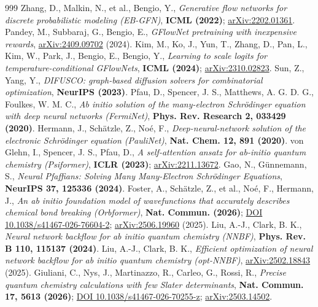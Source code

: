 \documentclass[onecolumn,a4paper]{quantumarticle}
\begin{document}
\begin{thebibliography}{999}
 Zhang, D., Malkin, N., et al., Bengio, Y., \emph{Generative flow networks for discrete probabilistic modeling (EB-GFN)}, \textbf{ICML (2022)}; \href{https://arxiv.org/abs/2202.01361}{arXiv:2202.01361}.
 Pandey, M., Subbaraj, G., Bengio, E., \emph{GFlowNet pretraining with inexpensive rewards}, \href{https://arxiv.org/abs/2409.09702}{arXiv:2409.09702} (2024).
 Kim, M., Ko, J., Yun, T., Zhang, D., Pan, L., Kim, W., Park, J., Bengio, E., Bengio, Y., \emph{Learning to scale logits for temperature-conditional GFlowNets}, \textbf{ICML (2024)}; \href{https://arxiv.org/abs/2310.02823}{arXiv:2310.02823}.
 Sun, Z., Yang, Y., \emph{DIFUSCO: graph-based diffusion solvers for combinatorial optimization}, \textbf{NeurIPS (2023)}.
 Pfau, D., Spencer, J. S., Matthews, A. G. D. G., Foulkes, W. M. C., \emph{Ab initio solution of the many-electron Schrödinger equation with deep neural networks (FermiNet)}, \textbf{Phys. Rev. Research 2, 033429 (2020)}.
 Hermann, J., Schätzle, Z., Noé, F., \emph{Deep-neural-network solution of the electronic Schrödinger equation (PauliNet)}, \textbf{Nat. Chem. 12, 891 (2020)}.
 von Glehn, I., Spencer, J. S., Pfau, D., \emph{A self-attention ansatz for ab-initio quantum chemistry (Psiformer)}, \textbf{ICLR (2023)}; \href{https://arxiv.org/abs/2211.13672}{arXiv:2211.13672}.
 Gao, N., Günnemann, S., \emph{Neural Pfaffians: Solving Many Many-Electron Schrödinger Equations}, \textbf{NeurIPS 37, 125336 (2024)}.
 Foster, A., Schätzle, Z., et al., Noé, F., Hermann, J., \emph{An ab initio foundation model of wavefunctions that accurately describes chemical bond breaking (Orbformer)}, \textbf{Nat. Commun. (2026)}; \href{https://doi.org/10.1038/s41467-026-76604-2}{DOI 10.1038/s41467-026-76604-2}; \href{https://arxiv.org/abs/2506.19960}{arXiv:2506.19960} (2025).
 Liu, A.-J., Clark, B. K., \emph{Neural network backflow for ab initio quantum chemistry (NNBF)}, \textbf{Phys. Rev. B 110, 115137 (2024)}.
 Liu, A.-J., Clark, B. K., \emph{Efficient optimization of neural network backflow for ab initio quantum chemistry (opt-NNBF)}, \href{https://arxiv.org/abs/2502.18843}{arXiv:2502.18843} (2025).
 Giuliani, C., Nys, J., Martinazzo, R., Carleo, G., Rossi, R., \emph{Precise quantum chemistry calculations with few Slater determinants}, \textbf{Nat. Commun. 17, 5613 (2026)}; \href{https://doi.org/10.1038/s41467-026-70255-z}{DOI 10.1038/s41467-026-70255-z}; \href{https://arxiv.org/abs/2503.14502}{arXiv:2503.14502}.

\end{thebibliography}
\end{document}

